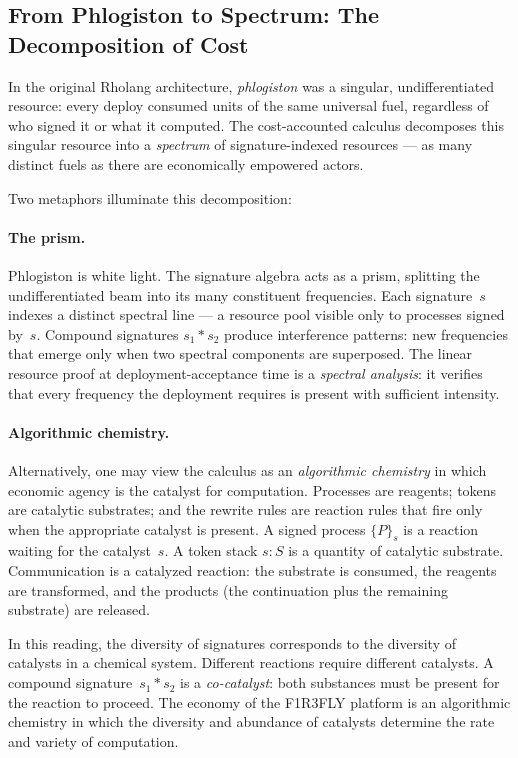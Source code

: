 \documentclass[11pt,a4paper]{article}
\newcommand{\signed}[2]{\{#1\}_{#2}}
\newcommand{\comp}{\mathbin{*}}
\begin{document}
\subsection{From Phlogiston to Spectrum: The Decomposition of
  Cost}
\label{sec:spectrum}

In the original Rholang architecture, \emph{phlogiston} was a
singular, undifferentiated resource: every deploy consumed units
of the same universal fuel, regardless of who signed it or what
it computed.  The cost-accounted calculus decomposes this
singular resource into a \emph{spectrum} of signature-indexed
resources --- as many distinct fuels as there are economically
empowered actors.

Two metaphors illuminate this decomposition:

\paragraph{The prism.}
Phlogiston is white light.  The signature algebra acts as a
prism, splitting the undifferentiated beam into its many
constituent frequencies.  Each signature~$s$ indexes a distinct
spectral line --- a resource pool visible only to processes
signed by~$s$.  Compound signatures $s_1 \comp s_2$ produce
interference patterns: new frequencies that emerge only when
two spectral components are superposed.  The linear resource
proof at deployment-acceptance time is a \emph{spectral
analysis}: it verifies that every frequency the deployment
requires is present with sufficient intensity.

\paragraph{Algorithmic chemistry.}
Alternatively, one may view the calculus as an \emph{algorithmic
chemistry} in which economic agency is the catalyst for
computation.  Processes are reagents; tokens are catalytic
substrates; and the rewrite rules are reaction rules that fire
only when the appropriate catalyst is present.  A signed
process $\signed{P}{s}$ is a reaction waiting for the
catalyst~$s$.  A token stack $s : S$ is a quantity of catalytic
substrate.  Communication is a catalyzed reaction: the substrate
is consumed, the reagents are transformed, and the products
(the continuation plus the remaining substrate) are released.

In this reading, the diversity of signatures corresponds to the
diversity of catalysts in a chemical system.  Different
reactions require different catalysts.  A compound
signature~$s_1 \comp s_2$ is a \emph{co-catalyst}: both
substances must be present for the reaction to proceed.  The
economy of the F1R3FLY platform is an algorithmic chemistry in
which the diversity and abundance of catalysts determine the
rate and variety of computation.
\end{document}
